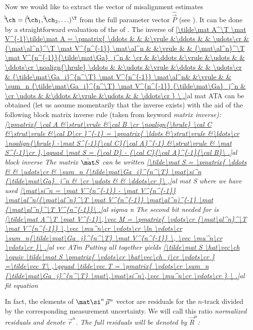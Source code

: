 Now we would like to extract the vector of misalignment estimates $\hat\vec\ch = (\hat\vec\ch_1, \hat\vec\ch_2, \ldots)^\T$ from the full parameter vector $\hat\vec P$ (see ). It can be done by a straightforward evaluation of the \rhs{} of . The inverse of
\eqref{\tilde\mat A^\T \mat V^{-1}\tilde\mat A =
\pmatrix{
\ddots 	& 											& 		&\vrule &\ddots & 														& \udots\cr
	 	& {\mat\al^n}^\T \mat V^{n^{-1}} \mat\al^n	& 		&\vrule & 		& {\mat\al^n}^\T \mat V^{n^{-1}}{\tilde\mat\Ga}_j^n 			& 		\cr
 		& 											&\ddots &\vrule &\udots & 														& \ddots\cr
\noalign{\hrule}
\ddots 	& 											&\udots	&\vrule &\ddots & 														& \udots\cr
	 	& {\tilde\mat\Ga_i}^{n^\T} \mat V^{n^{-1}} \mat\al^n& 		&\vrule & 		& \sum_n {\tilde\mat\Ga_i}^{n^\T} \mat V^{n^{-1}} {\tilde\mat\Ga}_j^n 	& \cr
\udots	& 											&\ddots &\vrule &\udots & 														& \ddots\cr
}
\ .}{al mat ATA}
can be obtained (let us assume momentarily that the inverse exists) with the aid of the following block matrix inverse rule (taken from  keyword \em{matrix inverse}):
\eqref{\pmatrix{
	\cal A	&\strut\vrule	&\cal B	\cr
	\noalign{\hrule}
	\cal C	&\strut\vrule	&\cal D\cr
	}^{-1} = \pmatrix{
	\ldots							&\strut\vrule	&\ldots\cr
	\noalign{\hrule}
	-\mat S^{-1}{\cal C}{\cal A}^{-1}	&\strut\vrule	& \mat S^{-1}\cr
},\qquad \mat S = {\cal D} - {\cal C}{\cal A}^{-1}{\cal B}\ .}{al block inverse}
The matrix $\tilde\mat S$ can be written
\eqref{\tilde\mat S = \pmatrix{
	\ddots	& 																		& \udots\cr
			& \sum_n {\tilde\mat\Ga_i}^{n^\T} \mat\si^n {\tilde\mat\Ga}_j^n 	& \cr
	\udots	& 																		& \ddots\cr
}\ ,}{al mat S}
where we have used
\eqref{\mat\si^n = \mat V^{n^{-1}} - \mat V^{n^{-1}} \mat\al^n({\mat\al^n}^\T \mat V^{n^{-1}} \mat\al^n)^{-1} \mat {\mat\al^n}^\T V^{n^{-1}}\ .}{al sigma n}
The second bit needed for  is
\eqref{\tilde\mat A^\T \mat V^{-1}\,\vec M = \pmatrix{
	\vdots\cr
	{\mat\al^n}^\T \mat V^{n^{-1}} \,\vec \mu^n\cr
	\vdots\cr
	\ln
	\vdots\cr
	\sum_n{\tilde\mat\Ga_j}^{n^\T} \mat V^{n^{-1}} \, \vec \mu^n\cr
	\vdots\cr
}\ .}{al vec ATm}
Putting all together yields
\eqref{\tilde\mat S \hat\vec\ch \equiv
\tilde\mat S \pmatrix{
	\vdots\cr
	\hat\vec\ch_j\cr
	\vdots\cr
}
=\tilde\vec T\ ,\qquad
\tilde\vec T = \pmatrix{
	\vdots\cr
	\sum_n {\tilde\mat\Ga_j}^{n^\T} \mat\,\mat\si^n\,\vec \mu^n\cr
	\vdots\cr
}
\ .}{al fit equation}

In fact, the elements of $\mat\si^n\,\vec \mu^n$ vector are residuals for the $n$-track divided by the corresponding measurement uncertainty. We will call this ratio \em{normalized residuals} and denote $\vec r^n$. The \em{full residuals} will be denoted by $\vec R^n$:

